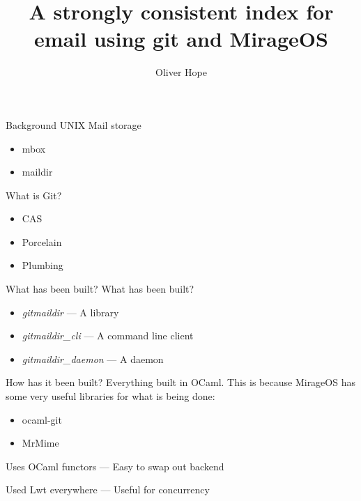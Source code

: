 \documentclass{beamer}
\title{A strongly consistent index for email using git and MirageOS}
\date{}
\author{Oliver Hope}
\institute{Jesus College}
\begin{document}
  \maketitle

  \begin{frame}[fragile]{Background}
    UNIX Mail storage

    \begin{itemize}
      \item mbox
      \item maildir
    \end{itemize}

    What is Git?

    \begin{itemize}
      \item CAS
      \item Porcelain
      \item Plumbing
    \end{itemize}
  \end{frame}

  \begin{frame}[fragile]{What has been built?}
    What has been built?

    \begin{itemize}
      \item \emph{gitmaildir} --- A library
      \item \emph{gitmaildir\_cli} --- A command line client
      \item \emph{gitmaildir\_daemon} --- A daemon
    \end{itemize}
  \end{frame}

  \begin{frame}{How has it been built?}
    Everything built in OCaml. This is because MirageOS has some very useful libraries for what is being done:

    \begin{itemize}
      \item ocaml-git
      \item MrMime
    \end{itemize}

    Uses OCaml functors --- Easy to swap out backend

    Used Lwt everywhere --- Useful for concurrency
  \end{frame}
\end{document}
